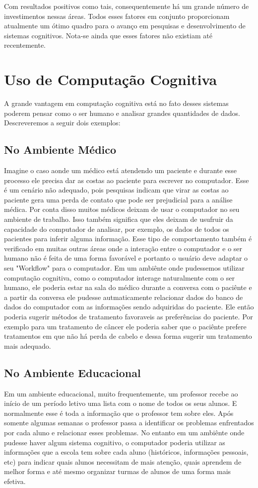 \documentclass[12pt]{article}
\begin{document}
Com resultados positivos como tais, consequentemente há um grande
número de investimentos nessas áreas. Todos esses fatores em conjunto 
proporcionam atualmente um ótimo quadro para o avanço em pesquisas e
desenvolvimento de sistemas cognitivos. Nota-se ainda que esses fatores
não existiam até recentemente.

\pagebreak
\section{Uso de Computação Cognitiva}
A grande vantagem em computação cognitiva está no fato desses sistemas
poderem pensar como o ser humano e analisar grandes quantidades de dados.
Descreveremos a seguir dois exemplos:
\subsection{No Ambiente Médico}
Imagine o caso aonde um médico está atendendo um paciente e durante esse
processo ele precisa dar as costas ao paciente para escrever no 
computador. Esse é um cenário não adequado, pois pesquisas indicam que
virar as costas ao paciente gera uma perda de contato que pode ser 
prejudicial para a análise médica. Por conta disso muitos médicos deixam
de usar o computador no seu ambiente de trabalho. Isso também significa
que eles deixam de usufruir da capacidade do computador de analisar, por
 exemplo, os dados de todos os pacientes para inferir alguma informação.
 Esse tipo de comportamento também é verificado em muitas outras áreas
 onde a interação entre o computador e o ser humano não é feita de uma
 forma favorável e portanto o usuário deve adaptar o seu "Workflow" para
 o computador.
 Em um ambiênte onde pudessemos utilizar computação cognitiva, como o
 computador interage naturalmente com o ser humano, ele poderia estar
 na sala do médico durante a conversa com o paciênte e a partir da 
 conversa ele pudesse autmaticamente relacionar dados do banco de dados
 do computador com as informações sendo adquiridas do paciente. Ele
 então poderia sugerir métodos de tratamento favoraveis as preferências
 do paciente. Por exemplo para um tratamento de câncer ele poderia saber
 que o paciênte prefere tratamentos em que não há perda de cabelo e 
 dessa forma sugerir um tratamento mais adequado.

\subsection{No Ambiente Educacional}
Em um ambiente educacional, muito frequentemente, um professor recebe 
ao início de um período letivo uma lista com o nome de todos os seus 
alunos. E normalmente esse é toda a informação que o professor tem sobre
eles. Após somente algumas semanas o professor passa a identificar os
problemas enfrentados por cada aluno e relacionar esses problemas. No
entanto em um ambiênte onde pudesse haver algum sistema cognitivo, o 
computador poderia utilizar as informações que a escola tem sobre cada
aluno (históricos, informações pessoais, etc) para indicar quais alunos 
necessitam de mais atenção, quais aprendem de melhor forma e até mesmo
organizar turmas de alunos de uma forma mais efetiva.
\end{document}
